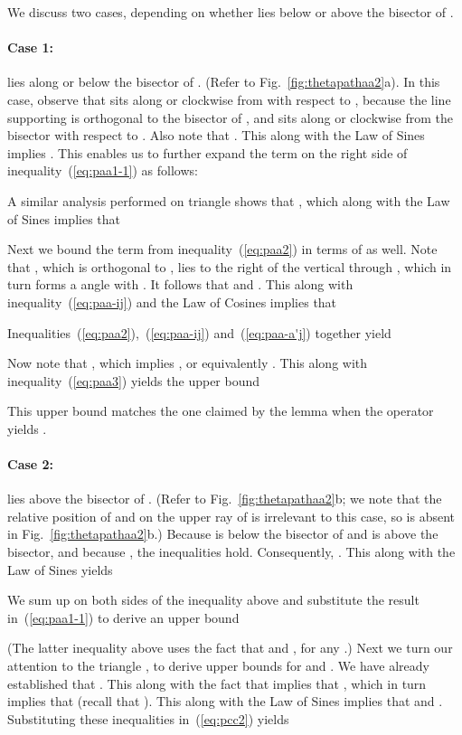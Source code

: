 \documentclass[11pt]{article}
\begin{document}
We discuss two cases, depending on whether  lies below or above the bisector of .

\paragraph{Case 1:}  lies along or below the bisector of . (Refer to Fig.~\ref{fig:thetapathaa2}a). In this case, observe that
 sits along or clockwise from  with respect to , because the line supporting  is orthogonal to the bisector of , and  sits along or clockwise from the bisector with respect to . Also note that . This along with the Law of Sines  implies . This enables us to further expand the term on the right side of inequality~(\ref{eq:paa1-1}) as follows:

A similar analysis performed on triangle  shows that , which along with the Law of Sines  implies that

Next we bound the term  from inequality~(\ref{eq:paa2}) in terms of  as well. Note that , which is orthogonal to , lies to the right of the vertical through , which in turn forms a  angle with . It follows that  and . This along with inequality~(\ref{eq:paa-ij}) and the Law of Cosines 
implies that

Inequalities~(\ref{eq:paa2}),~(\ref{eq:paa-ij}) and~(\ref{eq:paa-a'j}) together yield

Now note that , which implies , or equivalently . This along with inequality~(\ref{eq:paa3}) yields the upper bound

This upper bound matches the one claimed by the lemma when the  operator yields .

\paragraph{Case 2:}  lies above the bisector of . (Refer to Fig.~\ref{fig:thetapathaa2}b;
we note that the relative position of  and  on the upper ray of  is irrelevant to this case, so  is absent in Fig.~\ref{fig:thetapathaa2}b.)
Because  is below the bisector of  and  is above the bisector, and because , the inequalities  hold. Consequently,
. This along with the Law of Sines  yields

We sum up  on both sides of the inequality above and substitute the result in~(\ref{eq:paa1-1}) to derive an upper bound

(The latter inequality above uses the fact that  and , for any .)
Next we turn our attention to the triangle , to derive upper bounds for  and . We have already established that . This along with the fact that  implies that , which in turn implies that  (recall that ). This along with the Law of Sines
 implies that  and
.
Substituting these inequalities in~(\ref{eq:pcc2}) yields
\end{document}
